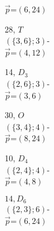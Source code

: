 \documentclass{beamer}
\begin{document}
\begin{frame}
\begin{figure}
\begin{center}
\begin{minipage}[b]{20mm}
$\vec{p}$=$(6,24)$
\end{minipage}
\begin{minipage}[b]{17mm}
\centering
{}\par
28, $T$ \\
$(\{3,6\};3)$-\\
$\vec{p}$=$(4,12)$
\end{minipage}
\begin{minipage}[b]{20mm}
\centering
{}\par
14, $D_{3}$\\
$(\{2,6\};3)$-\\
$\vec{p}$=$(3,6)$
\end{minipage} 
\begin{minipage}[b]{20mm}
\centering
{}\par
 30, $O$\\
$(\{3,4\};4)$-\\
$\vec{p}$=$(8,24)$
 \end{minipage} 
\begin{minipage}[b]{20mm}
\centering
{}\par
10, $D_{4}$\\
$(\{2,4\};4)$-\\
$\vec{p}$=$(4,8)$
\end{minipage} 
\begin{minipage}[b]{22mm}
\centering
{}\par
$14, D_{6}$\\
$(\{2,3\};6)$-\\
$\vec{p}$=$(6,24)$ 
\end{minipage}
\end{center}\end{figure}

\end{frame}
\end{document}
